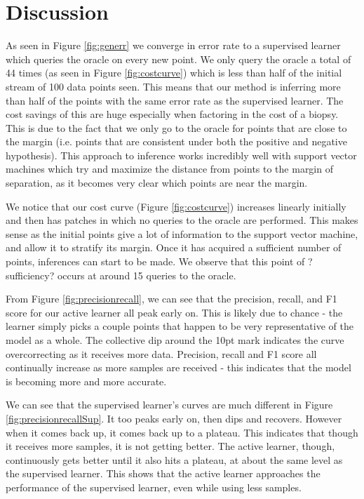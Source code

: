 \documentclass[12pt]{article}
\begin{document}
\section{Discussion}
As seen in Figure \ref{fig:generr} we converge in error rate to a supervised learner which queries the oracle on every new point. We only query the oracle a total of 44 times (as seen in Figure \ref{fig:costcurve}) which is less than half of the initial stream of 100 data points seen. This means that our method is inferring more than half of the points with the same error rate as the supervised learner. The cost savings of this are huge especially when factoring in the cost of a biopsy. This is due to the fact that we only go to the oracle for points that are close to the margin (i.e. points that are consistent under both the positive and negative hypothesis). This approach to inference works incredibly well with support vector machines which try and maximize the distance from points to the margin of separation, as it becomes very clear which points are near the margin.

We notice that our cost curve (Figure \ref{fig:costcurve}) increases linearly initially and then has patches in which no queries to the oracle are performed. This makes sense as the initial points give a lot of information to the support vector machine, and allow it to stratify its margin. Once it has acquired a sufficient number of points, inferences can start to be made. We observe that this point of ?sufficiency? occurs at around 15 queries to the oracle.

From Figure \ref{fig:precisionrecall}, we can see that the precision, recall, and F1 score for our active learner all peak early on. This is likely due to chance - the learner simply picks a couple points that happen to be very representative of the model as a whole. The collective dip around the 10pt mark indicates the curve overcorrecting as it receives more data. Precision, recall and F1 score all continually increase as more samples are received - this indicates that the model is becoming more and more accurate.

We can see that the supervised learner's curves are much different in Figure \ref{fig:precisionrecallSup}. It too peaks early on, then dips and recovers. However when it comes back up, it comes back up to a plateau. This indicates that though it receives more samples, it is not getting better. The active learner, though, continuously gets better until it also hits a plateau, at about the same level as the supervised learner. This shows that the active learner approaches the performance of the supervised learner, even while using less samples.
\end{document}
